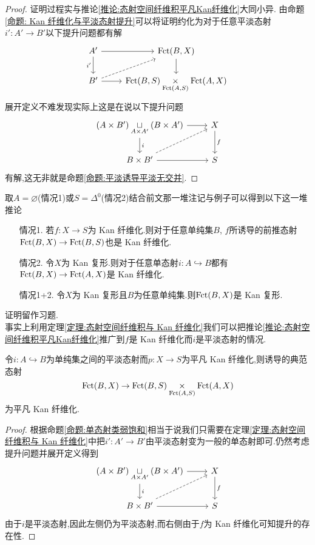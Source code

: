 \begin{proof}
    证明过程实与推论\ref{推论:态射空间纤维积平凡Kan纤维化}大同小异.
    由命题\ref{命题: Kan 纤维化与平淡态射提升}可以将证明约化为对于任意平淡态射$i' : A' \to B'$以下提升问题都有解
    \[\begin{tikzcd}
	{A'} & {\Fct(B,X)} \\
	{B'} & {\Fct(B,S) \dtimes{\Fct(A,S)}\Fct(A,X)}
	\arrow[from=1-1, to=1-2]
	\arrow["i'"', from=1-1, to=2-1]
	\arrow[from=1-2, to=2-2]
	\arrow[dashed, from=2-1, to=1-2]
	\arrow[from=2-1, to=2-2]
    \end{tikzcd}\]
    展开定义不难发现实际上这是在说以下提升问题
    \[\begin{tikzcd}
	{(A\times B')\dsqcup{A \times A'} (B\times A')} & X \\
	{B\times B'} & S
	\arrow[from=1-1, to=1-2]
	\arrow["i", from=1-1, to=2-1]
	\arrow["f", from=1-2, to=2-2]
	\arrow[dashed, from=2-1, to=1-2]
	\arrow[from=2-1, to=2-2]
    \end{tikzcd}\]
    有解,这无非就是命题\ref{命题:平淡诱导平淡无交并}.
\end{proof}
取$A = \varnothing$(情况1)或$S = \Delta^0$(情况2)结合前文那一堆注记与例子可以得到以下这一堆推论
\begin{corollary}\label{推论:映射空间为 Kan 复形}
    \begin{itemize}
        \item[情况1.] 若$f : X \to S$为 Kan 纤维化.则对于任意单纯集$B$, $f$所诱导的前推态射$\operatorname{Fct}(B,X)\to \operatorname{Fct}(B,S)$也是 Kan 纤维化.
        \item[情况2.] 令$X$为 Kan 复形.则对于任意单态射$i : A\hookrightarrow B$都有$\operatorname{Fct}(B,X) \to \operatorname{Fct}(A,X)$是 Kan 纤维化.
        \item[情况1+2.] 令$X$为 Kan 复形且$B$为任意单纯集.则$\operatorname{Fct}(B,X)$是 Kan 复形.
    \end{itemize}
\end{corollary}
证明留作习题.\\
事实上利用定理\ref{定理:态射空间纤维积与 Kan 纤维化}我们可以把推论\ref{推论:态射空间纤维积平凡Kan纤维化}推广到$f$是 Kan 纤维化而$i$是平淡态射的情况.
\begin{theorem}\label{定理:平淡态射与平凡 Kan 纤维化}
    令$i : A \hookrightarrow B$为单纯集之间的平淡态射而$p : X \to S$为平凡 Kan 纤维化,则诱导的典范态射
    \[
    \operatorname{Fct}(B,X) \to \operatorname{Fct}(B,S)\underset{\operatorname{Fct}(A,S)}{\times}\operatorname{Fct}(A,X)
    \]
    为平凡 Kan 纤维化.
\end{theorem}
\begin{proof}
    根据命题\ref{命题:单态射类弱饱和}相当于说我们只需要在定理\ref{定理:态射空间纤维积与 Kan 纤维化}中把$i':A' \to B'$由平淡态射变为一般的单态射即可.仍然考虑提升问题并展开定义得到
    \[\begin{tikzcd}
	{(A\times B')\dsqcup{A \times A'} (B\times A')} & X \\
	{B\times B'} & S
	\arrow[from=1-1, to=1-2]
	\arrow["i", from=1-1, to=2-1]
	\arrow["f", from=1-2, to=2-2]
	\arrow[dashed, from=2-1, to=1-2]
	\arrow[from=2-1, to=2-2]
    \end{tikzcd}\]
    由于$i$是平淡态射,因此左侧仍为平淡态射,而右侧由于$f$为 Kan 纤维化可知提升的存在性.
\end{proof}
